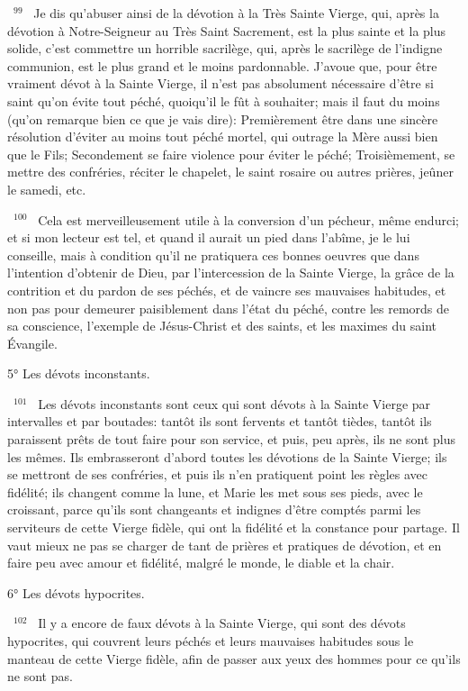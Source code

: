 \documentclass[paper=a5,pagesize=pdftex,fontsize=15pt,headinclude=on,twoside=off]{scrbook}
\newcommand{\negphantom}[1]{\settowidth{\dimen0}{#1}\hspace*{-\dimen0}}
\newcommand{\versenb}[1]{\par \vspace{10pt}~\negphantom{~${}^{#1}$~}${}^{#1}$~}
\begin{document}
\versenb{99} Je dis qu'abuser ainsi de la dévotion à la Très Sainte Vierge, qui, après la dévotion à Notre-Seigneur au Très
Saint Sacrement, est la plus sainte et la plus solide, c'est commettre un horrible sacrilège, qui, après le sacrilège
de l'indigne communion, est le plus grand et le moins pardonnable.
J'avoue que, pour être vraiment dévot à la Sainte Vierge, il n'est pas absolument nécessaire d'être si saint qu'on
évite tout péché, quoiqu'il le fût à souhaiter; mais il faut du moins (qu'on remarque bien ce que je vais dire):
Premièrement être dans une sincère résolution d'éviter au moins tout péché mortel, qui outrage la Mère aussi bien
que le Fils;
Secondement se faire violence pour éviter le péché;
Troisièmement, se mettre des confréries, réciter le chapelet, le saint rosaire ou autres prières, jeûner le samedi,
etc.
\versenb{100} Cela est merveilleusement utile à la conversion d'un pécheur, même endurci; et si mon lecteur est tel, et
quand il aurait un pied dans l'abîme, je le lui conseille, mais à condition qu'il ne pratiquera ces bonnes oeuvres que
dans l'intention d'obtenir de Dieu, par l'intercession de la Sainte Vierge, la grâce de la contrition et du pardon de
ses péchés, et de vaincre ses mauvaises habitudes, et non pas pour demeurer paisiblement dans l'état du péché,
contre les remords de sa conscience, l'exemple de Jésus-Christ et des saints, et les maximes du saint Évangile.

5° Les dévots inconstants.
\versenb{101} Les dévots inconstants sont ceux qui sont dévots à la Sainte Vierge par intervalles et par boutades: tantôt ils
sont fervents et tantôt tièdes, tantôt ils paraissent prêts de tout faire pour son service, et puis, peu après, ils ne
sont plus les mêmes. Ils embrasseront d'abord toutes les dévotions de la Sainte Vierge; ils se mettront de ses
confréries, et puis ils n'en pratiquent point les règles avec fidélité; ils changent comme la lune, et Marie les met
sous ses pieds, avec le croissant, parce qu'ils sont changeants et indignes d'être comptés parmi les serviteurs de
cette Vierge fidèle, qui ont la fidélité et la constance pour partage. Il vaut mieux ne pas se charger de tant de
prières et pratiques de dévotion, et en faire peu avec amour et fidélité, malgré le monde, le diable et la chair.

6° Les dévots hypocrites.
\versenb{102} Il y a encore de faux dévots à la Sainte Vierge, qui sont des dévots hypocrites, qui couvrent leurs péchés et
leurs mauvaises habitudes sous le manteau de cette Vierge fidèle, afin de passer aux yeux des hommes pour ce
qu'ils ne sont pas.
\end{document}
